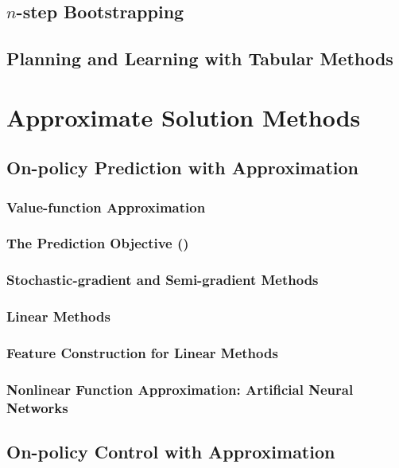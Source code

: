 \documentclass[a4paper,chapter,microtype,fleqn,oneside]{oblivoir}
\begin{document}
\chapter{$n$-step Bootstrapping}\label{ch:n-step-bootstrapping}

\chapter{Planning and Learning with Tabular Methods}\label{ch:planning-and-learning-with-tabular-methods}

\part{Approximate Solution Methods}\label{ch:approximate-solution-methods}

\chapter{On-policy Prediction with Approximation}\label{ch:on-policy-prediction-with-approximation}
\section{Value-function Approximation}
\section{The Prediction Objective ()}
\section{Stochastic-gradient and Semi-gradient Methods}
\section{Linear Methods}
\section{Feature Construction for Linear Methods}
\section{Nonlinear Function Approximation: Artificial Neural Networks}\label{sec:nonlinear-function-approximation-artificial-neural-networks}

\chapter{On-policy Control with Approximation}\label{ch:on-policy-control-with-approximation}
\end{document}
